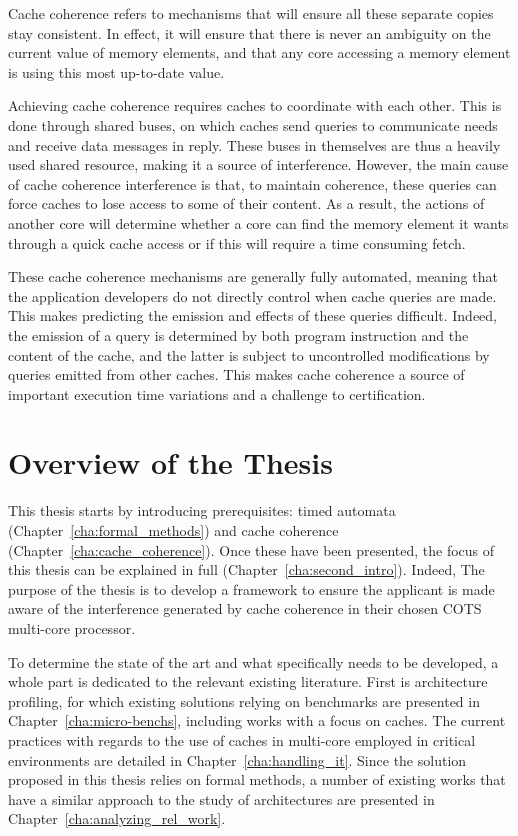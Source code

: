 Cache coherence refers to mechanisms that will ensure all these separate copies
stay consistent. In effect, it will ensure that there is never an ambiguity on
the current value of memory elements, and that any core accessing a memory
element is using this most up-to-date value.

Achieving cache coherence requires caches to coordinate with each other. This
is done through shared buses, on which caches send queries to communicate needs
and receive data messages in reply. These buses in themselves are thus a
heavily used shared resource, making it a source of interference. However, the
main cause of cache coherence interference is that, to maintain coherence, these
queries can force caches to lose access to some of their content. As a result,
the actions of another core will determine whether a core can find the memory
element it wants through a quick cache access or if this will require a time
consuming fetch.

These cache coherence mechanisms are generally fully automated, meaning that
the application developers do not directly control when cache queries are made.
This makes predicting the emission and effects of these queries difficult.
Indeed, the emission of a query is determined by both program instruction and
the content of the cache, and the latter is subject to uncontrolled
modifications by queries emitted from other caches. This makes cache coherence
a source of important execution time variations and a challenge to
certification.

\section{Overview of the Thesis}
This thesis starts by introducing prerequisites: timed automata
(Chapter~\ref{cha:formal_methods}) and cache
coherence (Chapter~\ref{cha:cache_coherence}).
Once these have
been presented, the focus of this thesis can be explained in full
(Chapter~\ref{cha:second_intro}).
Indeed, The purpose of the thesis is to
develop a framework to ensure the applicant is made aware of the interference
generated by cache coherence in their chosen COTS multi-core processor.

To determine the state of the art and what specifically needs to be developed,
a whole part is dedicated to the relevant existing literature.
First is architecture profiling, for which existing solutions
relying on benchmarks are presented in Chapter~\ref{cha:micro-benchs}, including
works with a focus on caches. The current practices with regards to the use of
caches in multi-core employed in critical environments are detailed in
Chapter~\ref{cha:handling_it}. Since the solution proposed in this thesis
relies on formal methods, a number of existing works that have a similar
approach to the study of architectures are presented in
Chapter~\ref{cha:analyzing_rel_work}.

